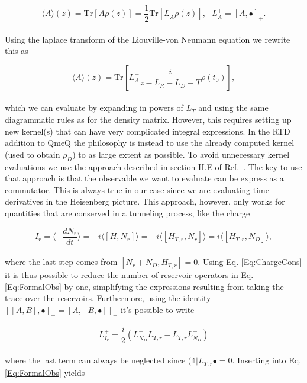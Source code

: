 \documentclass{article}
\newcommand{\bral}[1]{\ensuremath{( #1 |}}
\newcommand{\Tr}{\ensuremath{\text{Tr}}}
\begin{document}
\begin{equation}
    \langle A  \rangle(z) = \Tr \left [A \rho(z) \right ] = \frac{1}{2}\Tr \left [ L_A^+\rho(z) \right ], \ \ \ L_A^+=[A,\bullet]_+.
\end{equation}
\\
Using the laplace transform of the Liouville-von Neumann equation we rewrite this as 

\begin{equation}
    \langle A \rangle (z) =\Tr \left[ L_A^+\frac{i}{z-L_R-L_D-T} \rho(t_0)\right ],
    \label{Eq:FormalObs}
\end{equation}
\\
which we can evaluate by expanding in powers of $L_T$ and using the same diagrammatic rules as for the density matrix. However, this requires setting up new kernel(s) that can have very complicated integral expressions. In the RTD addition to QmeQ the philosophy is instead to use the already computed kernel (used to obtain $\rho_D$) to as large extent as possible. To avoid unnecessary kernel evaluations we use the approach described in section II.E of Ref.~\cite{saptsov2012fermionic}. The key to use that approach is that the observable we want to evaluate can be express as a commutator. This is always true in our case since we are evaluating time derivatives in the Heisenberg picture. This approach, however, only works for quantities that are conserved in a tunneling process, like the charge

\begin{equation}
    I_r = \langle -\frac{dN_r}{dt} \rangle = -i\langle [H, N_r] \rangle = -i\langle [H_{T,r}, N_r] \rangle = i\langle [H_{T,r}, N_D] \rangle, 
    \label{Eq:ChargeCons}
\end{equation}
\\
where the last step comes from $[N_r+N_D, H_{T,r}]=0$. Using Eq. \ref{Eq:ChargeCons} it is thus possible to reduce the number of reservoir operators in Eq. \ref{Eq:FormalObs} by one, simplifying the expressions resulting from taking the trace over the reservoirs. Furthermore, using the identity $[[A,B],\bullet]_+=[A,[B,\bullet]]_+$ it's possible to write

\begin{equation}
    L_{I_r}^+ = \frac{i}{2} \left (  L_{N_D}^+L_{T,r} - L_{T,r}L_{N_D}^+ \right ) 
\end{equation}
\\
where the last term can always be neglected since $\bral{\mathbb{1}}L_{T,r}\bullet=0$. Inserting into Eq. \ref{Eq:FormalObs} yields
\end{document}
